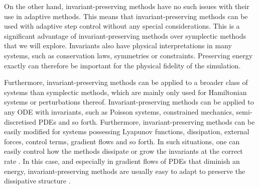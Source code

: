 \documentclass[final,3p,times]{elsarticle}
\begin{document}
On the other hand, invariant-preserving methods have no such issues with their use in adaptive methods. This means that invariant-preserving methods can be used with adaptive step control without any special considerations. This is a significant advantage of invariant-preserving methods over symplectic methods that we will explore. Invariants also have physical interpretations in many systems, such as conservation laws, symmetries or constraints. Preserving energy exactly can therefore be important for the physical fidelity of the simulation. 

Furthermore, invariant-preserving methods can be applied to a broader class of systems than symplectic methods, which are mainly only used for Hamiltonian systems or perturbations thereof. Invariant-preserving methods can be applied to any ODE with invariants, such as Poisson systems, constrained mechanics, semi-discretised PDEs and so forth. Furthermore, invariant-preserving methods can be easily modified for systems possessing Lyapunov functions, dissipation, external forces, control terms, gradient flows and so forth. In such situations, one can easily control how the methods dissipate or grow the invariants at the correct rate \cite{mclachlan1999geometric}.
In this case, and especially in gradient flows of PDEs that diminish an energy, invariant-preserving methods are usually easy to adapt to preserve the dissipative structure \cite{fu2024energy}. 
\end{document}
